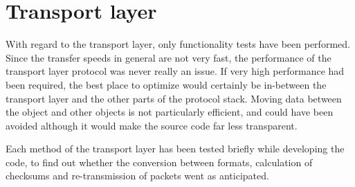 \section{Transport layer}
With regard to the transport layer, only functionality tests have been performed. Since the transfer speeds in general are not very fast, the performance of the transport layer protocol was never really an issue. If very high performance had been required, the best place to optimize would certainly be in-between the transport layer and the other parts of the protocol stack. Moving data between the  object and other objects is not particularly efficient, and could have been avoided although it would make the source code far less transparent.

Each method of the transport layer has been tested briefly while developing the code, to find out whether the conversion between formats, calculation of checksums and re-transmission of packets went as anticipated.